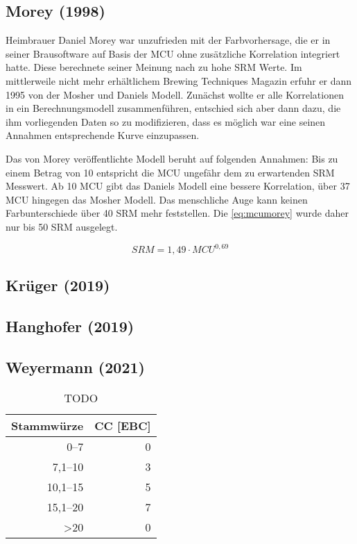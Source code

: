 \documentclass[a4paper,parskip=half]{scrartcl}
\newcommand{\MCU}{\mathit{MCU}}
\newcommand{\SRM}{\mathit{SRM}}
\begin{document}
\subsection*{Morey (1998)}

Heimbrauer Daniel Morey war unzufrieden mit der Farbvorhersage, die er in seiner Brausoftware auf Basis der MCU ohne zusätzliche Korrelation integriert hatte. Diese berechnete seiner Meinung nach zu hohe SRM Werte. Im mittlerweile nicht mehr erhältlichem Brewing Techniques Magazin erfuhr er dann 1995 von der Mosher und Daniels Modell. Zunächst wollte er alle Korrelationen in ein Berechnungsmodell zusammenführen, entschied sich aber dann dazu, die ihm vorliegenden Daten so zu modifizieren, dass es möglich war eine seinen Annahmen entsprechende Kurve einzupassen. \parencite{Smith2010}

Das von Morey veröffentlichte Modell beruht auf folgenden Annahmen: Bis zu einem Betrag von 10 entspricht die MCU ungefähr dem zu erwartenden SRM Messwert. Ab 10 MCU gibt das Daniels Modell eine bessere Korrelation, über 37 MCU hingegen das Mosher Modell. Das menschliche Auge kann keinen Farbunterschiede über 40 SRM mehr feststellen. Die \autoref{eq:mcumorey} wurde daher nur bis 50 SRM ausgelegt.
\parencite{Morey}

\begin{equation}
\SRM = 1,49 \cdot \MCU^{0,69}
\label{eq:mcumorey}
\end{equation}

\subsection*{Krüger (2019)}



\subsection*{Hanghofer (2019)}

\parencite[78]{Hanghofer2019}



\subsection*{Weyermann (2021)}

\parencite{KrausWeyermann2021b}

\begin{table}[H]
\centering
\begin{tabular}{rr}
\toprule
\multicolumn{1}{c}{\textbf{Stammwürze}} & \multicolumn{1}{c}{\textbf{CC [EBC]}} \\
\midrule
0–7 & 0 \\
7,1–10 & 3 \\
10,1–15 & 5 \\
15,1–20 & 7 \\
>20 & 0 \\
\bottomrule
\end{tabular}
\caption{TODO \parencite{KrausWeyermann2021b}}
\label{table:ccweyermann}
\end{table}
\end{document}
